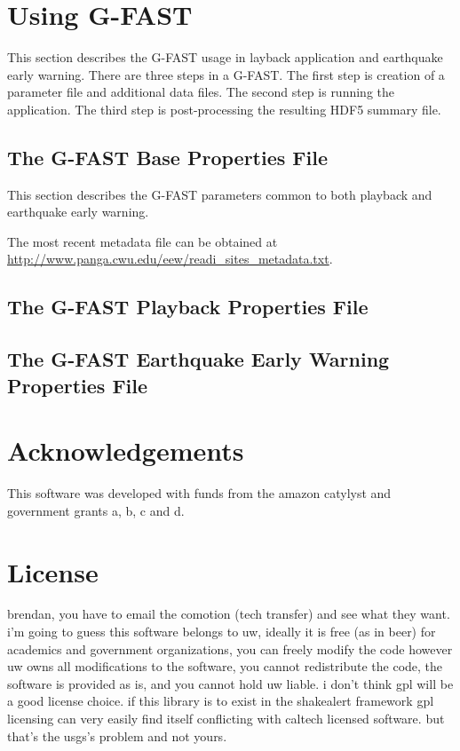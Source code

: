 \documentclass[12pt]{article}
\begin{document}
\section{Using G-FAST}
This section describes the G-FAST usage in layback application and earthquake early warning.  
There are three steps in a G-FAST.  The first step is creation of a parameter file and 
additional data files.  The second step is running the application.  The third step is
post-processing the resulting HDF5 summary file.

\subsection{The G-FAST Base Properties File}\label{S:propertiesFile}
This section describes the G-FAST parameters common to both playback and earthquake early warning.

The most recent metadata file can be obtained at 
\url{http://www.panga.cwu.edu/eew/readi_sites_metadata.txt}.  

\subsection{The G-FAST Playback Properties File}

\subsection{The G-FAST Earthquake Early Warning Properties File}

\section{Acknowledgements}
This software was developed with funds from the amazon catylyst and government grants a, b, c and d.  

\appendix
\section{License}\label{s:license}
brendan, you have to email the comotion (tech transfer) and see what they want.  
i'm going to guess this software belongs to uw, ideally it is free (as in beer) 
for academics and government organizations, you can freely modify the code however uw owns 
all modifications to the software, you cannot redistribute the code, the software
is provided as is, and you cannot hold uw liable.  i don't think gpl will be a good license
choice.  if this library is to exist in the shakealert framework gpl licensing can very easily 
find itself conflicting with caltech licensed software.  but that's the usgs's problem and not yours.   
\end{document}
